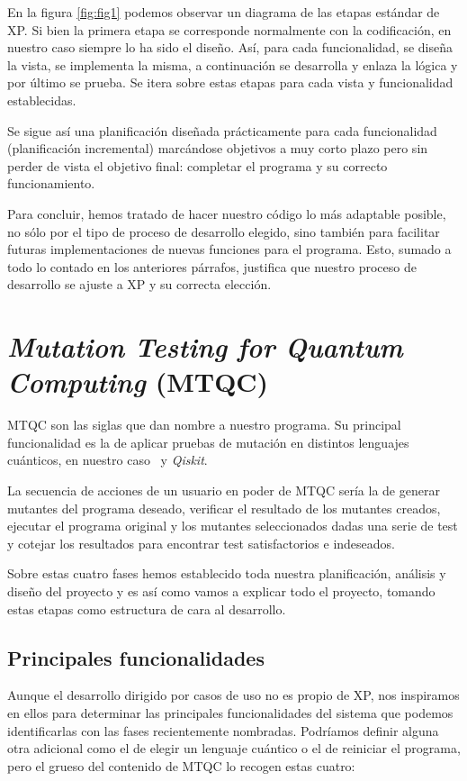 En la figura \ref{fig:fig1} podemos observar un diagrama de las etapas estándar de XP. Si bien la primera etapa se corresponde normalmente con la codificación, en nuestro caso siempre lo ha sido el diseño. Así, para cada funcionalidad, se diseña la vista, se implementa la misma, a continuación se desarrolla y enlaza la lógica y por último se prueba. Se itera sobre estas etapas para cada vista y funcionalidad establecidas.

Se sigue así una planificación diseñada prácticamente para cada funcionalidad (planificación incremental) marcándose objetivos a muy corto plazo pero sin perder de vista el objetivo final: completar el programa y su correcto funcionamiento.

Para concluir, hemos tratado de hacer nuestro código lo más adaptable posible, no sólo por el tipo de proceso de desarrollo elegido, sino también para facilitar futuras implementaciones de nuevas funciones para el programa. Esto, sumado a todo lo contado en los anteriores párrafos, justifica que nuestro proceso de desarrollo se ajuste a XP y su correcta elección.

\section{\textit{Mutation Testing for Quantum Computing} (MTQC)}

MTQC son las siglas que dan nombre a nuestro programa. Su principal funcionalidad es la de aplicar pruebas de mutación en distintos lenguajes cuánticos, en nuestro caso \qsh\ y \textit{Qiskit}.

La secuencia de acciones de un usuario en poder de MTQC sería la de generar mutantes del programa deseado, verificar el resultado de los mutantes creados, ejecutar el programa original y los mutantes seleccionados dadas una serie de test y cotejar los resultados para encontrar test satisfactorios e indeseados.

Sobre estas cuatro fases hemos establecido toda nuestra planificación, análisis y diseño del proyecto y es así como vamos a explicar todo el proyecto, tomando estas etapas como estructura de cara al desarrollo.

\subsection{Principales funcionalidades}

Aunque el desarrollo dirigido por casos de uso no es propio de XP, nos inspiramos en ellos para determinar las principales funcionalidades del sistema que podemos identificarlas con las fases recientemente nombradas. Podríamos definir alguna otra adicional como el de elegir un lenguaje cuántico o el de reiniciar el programa, pero el grueso del contenido de MTQC lo recogen estas cuatro:

